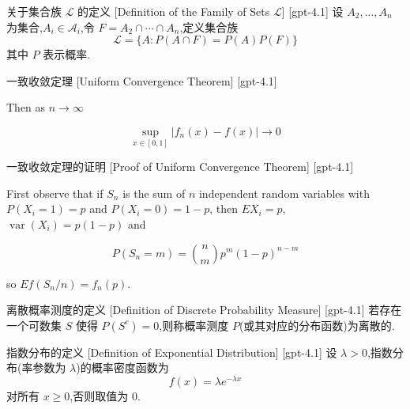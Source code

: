 \documentclass[UTF8]{ctexart}
\begin{document}
    
    
    \begin{dfn}
        {关于集合族 $\mathcal{L}$ 的定义}
        [Definition of the Family of Sets $\mathcal{L}$]
        [gpt-4.1]
        设 $A_2, \ldots, A_n$ 为集合,$A_i \in \mathcal{A}_i$,令 $F = A_2 \cap \cdots \cap A_n$,定义集合族
\[
\mathcal{L} = \{ A : P(A \cap F) = P(A) P(F) \}
\]
其中 $P$ 表示概率.
    \end{dfn}
    
    
    
    \begin{thm}
        {一致收敛定理}
        [Uniform Convergence Theorem]
        [gpt-4.1]
        
Then as $n \to \infty$

\[
\sup_{x \in [0,1]} |f_n(x) - f(x)| \to 0
\]

    \end{thm}
    
    
    
    \begin{prf}
        {一致收敛定理的证明}
        [Proof of Uniform Convergence Theorem]
        [gpt-4.1]
        
First observe that if $S_n$ is the sum of $n$ independent random variables with $P(X_i = 1) = p$ and $P(X_i = 0) = 1 - p$, then $E X_i = p$, $\operatorname{var}(X_i) = p(1-p)$ and

\[
P(S_n = m) = \binom{n}{m} p^m (1-p)^{n-m}
\]

so $E f(S_n / n) = f_n(p)$.

    \end{prf}
    
    
    
    \begin{dfn}
        {离散概率测度的定义}
        [Definition of Discrete Probability Measure]
        [gpt-4.1]
        若存在一个可数集 $S$ 使得 $P(S^c) = 0$,则称概率测度 $P$(或其对应的分布函数)为离散的.
    \end{dfn}
    
    
    
    \begin{dfn}
        {指数分布的定义}
        [Definition of Exponential Distribution]
        [gpt-4.1]
        设 $\lambda > 0$,指数分布(率参数为 $\lambda$)的概率密度函数为
\[
f(x) = \lambda e^{-\lambda x}
\]
对所有 $x \geq 0$,否则取值为 0.
    \end{dfn}
    
\end{document}
